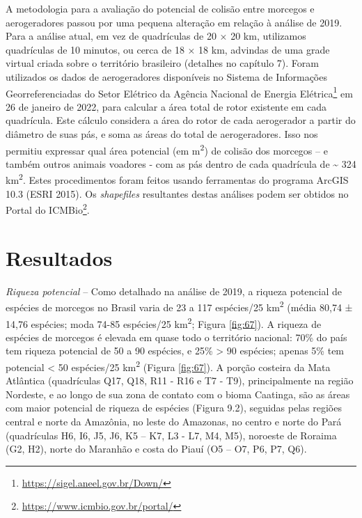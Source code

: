 \documentclass[
  oneside]{scrbook}
\DeclareRobustCommand{\href}[2]{#2\footnote{\url{#1}}}
\begin{document}
A metodologia para a avaliação do potencial de colisão entre morcegos e aerogeradores passou por uma pequena alteração em relação à análise de 2019. Para a análise atual, em vez de quadrículas de 20 × 20 km, utilizamos quadrículas de 10 minutos, ou cerca de 18 × 18 km, advindas de uma grade virtual criada sobre o território brasileiro (detalhes no capítulo 7). Foram utilizados os dados de aerogeradores disponíveis no \href{https://sigel.aneel.gov.br/Down/}{Sistema de Informações Georreferenciadas do Setor Elétrico da Agência Nacional de Energia Elétrica} em 26 de janeiro de 2022, para calcular a área total de rotor existente em cada quadrícula. Este cálculo considera a área do rotor de cada aerogerador a partir do diâmetro de suas pás, e soma as áreas do total de aerogeradores. Isso nos permitiu expressar qual área potencial (em m\textsuperscript{2}) de colisão dos morcegos -- e também outros animais voadores - com as pás dentro de cada quadrícula de \textasciitilde{} 324 km\textsuperscript{2}. Estes procedimentos foram feitos usando ferramentas do programa ArcGIS 10.3 (ESRI 2015). Os \emph{shapefiles} resultantes destas análises podem ser obtidos no \href{https://www.icmbio.gov.br/portal/}{Portal do ICMBio}.

\hypertarget{resultados-2}{%
\section{Resultados}\label{resultados-2}}

\emph{Riqueza potencial} -- Como detalhado na análise de 2019, a riqueza potencial de espécies de morcegos no Brasil varia de 23 a 117 espécies/25 km\textsuperscript{2} (média 80,74 ± 14,76 espécies; moda 74-85 espécies/25 km\textsuperscript{2}; Figura \ref{fig:67}). A riqueza de espécies de morcegos é elevada em quase todo o território nacional: 70\% do país tem riqueza potencial de 50 a 90 espécies, e 25\% \textgreater{} 90 espécies; apenas 5\% tem potencial \textless{} 50 espécies/25 km\textsuperscript{2} (Figura \ref{fig:67}). A porção costeira da Mata Atlântica (quadrículas Q17, Q18, R11 - R16 e T7 - T9), principalmente na região Nordeste, e ao longo de sua zona de contato com o bioma Caatinga, são as áreas com maior potencial de riqueza de espécies (Figura 9.2), seguidas pelas regiões central e norte da Amazônia, no leste do Amazonas, no centro e norte do Pará (quadrículas H6, I6, J5, J6, K5 -- K7, L3 - L7, M4, M5), noroeste de Roraima (G2, H2), norte do Maranhão e costa do Piauí (O5 -- O7, P6, P7, Q6).
\end{document}
